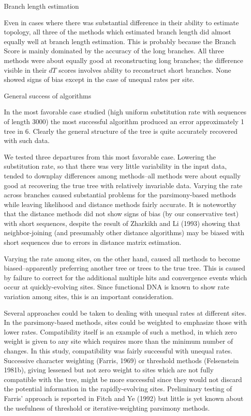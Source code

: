 \noindent
Branch length estimation
\bigskip


 Even in cases where there was 
substantial difference in their ability to estimate topology, all three of 
the methods which estimated branch length did almost equally well at branch
length estimation.  This is probably because the Branch Score
is mainly dominated by the accuracy of the long 
branches.  All three methods were about equally good at 
reconstructing long branches; the difference visible in their $dT$ 
scores involves ability to reconstruct short branches.  None showed 
signs of bias except in the case of unequal rates per site.
\bigskip

\bigskip

\noindent
General success of algorithms
\bigskip


  In the most favorable case 
studied (high uniform substitution rate with sequences of length 3000) 
the most successful algorithm produced an error approximately 1 
tree in 6.  Clearly the general structure of the tree is quite 
accurately recovered with such data.

	We tested three departures from this most favorable case.  
Lowering the substitution rate, so that there was very little 
variability in the input data, tended to downplay differences 
among methods--all methods were about equally good at recovering 
the true tree with relatively invariable data.  Varying the rate 
across branches caused substantial problems for the parsimony-based 
methods while leaving likelihood and distance methods fairly 
accurate.  It is noteworthy that the distance methods did not show signs
of bias (by our conservative test) with short sequences,
despite the result of Zharkikh and Li (1993) showing that neighbor-joining (and
presumably other distance algorithms) may be biased with short
sequences due to errors in distance matrix estimation.

  Varying the rate among sites, on the other hand, caused all 
methods to become biased--apparently preferring another tree 
or trees to the true tree.  This is caused by failure to correct for the 
additional multiple hits and convergence events which occur at 
quickly-evolving sites.  Since functional DNA is known to show rate variation 
among sites, this is an important consideration.

	Several approaches could be taken to dealing with unequal 
rates at different sites.  In the parsimony-based methods, sites 
could be weighted to emphasize those with lower rates.  
Compatibility itself is an example of such a method, in which zero 
weight is given to any site which requires more than the minimum 
number of changes.  In this study, compatibility was fairly 
successful with unequal rates.  Successive character weighting (Farris, 1969)
or threshold methods (Felsenstein 
1981b), giving lessened but not zero weight to sites which are not 
fully compatible with the tree, might be more successful since they
would not discard the potential information in the rapidly-evolving 
sites.  Preliminary 
testing of Farris' approach is reported in Fitch and Ye (1992) but little is 
yet known about the usefulness of threshold or iterative-weighting 
parsimony methods.

